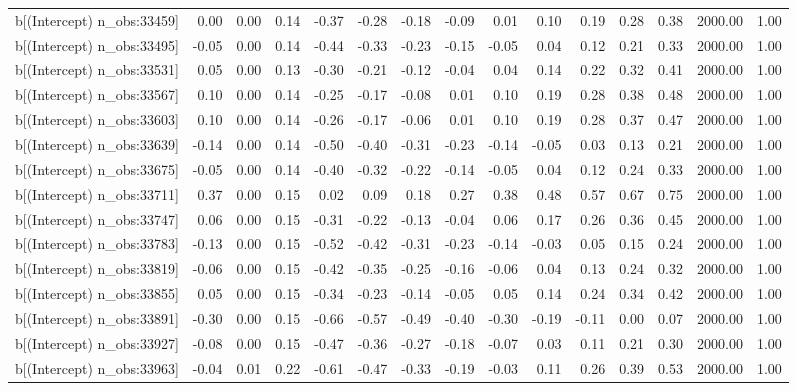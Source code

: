 \begin{table}[ht]
\begin{tabular}{rrrrrrrrrrrrrrr}
  b[(Intercept) n\_obs:33459] & 0.00 & 0.00 & 0.14 & -0.37 & -0.28 & -0.18 & -0.09 & 0.01 & 0.10 & 0.19 & 0.28 & 0.38 & 2000.00 & 1.00 \\ 
  b[(Intercept) n\_obs:33495] & -0.05 & 0.00 & 0.14 & -0.44 & -0.33 & -0.23 & -0.15 & -0.05 & 0.04 & 0.12 & 0.21 & 0.33 & 2000.00 & 1.00 \\ 
  b[(Intercept) n\_obs:33531] & 0.05 & 0.00 & 0.13 & -0.30 & -0.21 & -0.12 & -0.04 & 0.04 & 0.14 & 0.22 & 0.32 & 0.41 & 2000.00 & 1.00 \\ 
  b[(Intercept) n\_obs:33567] & 0.10 & 0.00 & 0.14 & -0.25 & -0.17 & -0.08 & 0.01 & 0.10 & 0.19 & 0.28 & 0.38 & 0.48 & 2000.00 & 1.00 \\ 
  b[(Intercept) n\_obs:33603] & 0.10 & 0.00 & 0.14 & -0.26 & -0.17 & -0.06 & 0.01 & 0.10 & 0.19 & 0.28 & 0.37 & 0.47 & 2000.00 & 1.00 \\ 
  b[(Intercept) n\_obs:33639] & -0.14 & 0.00 & 0.14 & -0.50 & -0.40 & -0.31 & -0.23 & -0.14 & -0.05 & 0.03 & 0.13 & 0.21 & 2000.00 & 1.00 \\ 
  b[(Intercept) n\_obs:33675] & -0.05 & 0.00 & 0.14 & -0.40 & -0.32 & -0.22 & -0.14 & -0.05 & 0.04 & 0.12 & 0.24 & 0.33 & 2000.00 & 1.00 \\ 
  b[(Intercept) n\_obs:33711] & 0.37 & 0.00 & 0.15 & 0.02 & 0.09 & 0.18 & 0.27 & 0.38 & 0.48 & 0.57 & 0.67 & 0.75 & 2000.00 & 1.00 \\ 
  b[(Intercept) n\_obs:33747] & 0.06 & 0.00 & 0.15 & -0.31 & -0.22 & -0.13 & -0.04 & 0.06 & 0.17 & 0.26 & 0.36 & 0.45 & 2000.00 & 1.00 \\ 
  b[(Intercept) n\_obs:33783] & -0.13 & 0.00 & 0.15 & -0.52 & -0.42 & -0.31 & -0.23 & -0.14 & -0.03 & 0.05 & 0.15 & 0.24 & 2000.00 & 1.00 \\ 
  b[(Intercept) n\_obs:33819] & -0.06 & 0.00 & 0.15 & -0.42 & -0.35 & -0.25 & -0.16 & -0.06 & 0.04 & 0.13 & 0.24 & 0.32 & 2000.00 & 1.00 \\ 
  b[(Intercept) n\_obs:33855] & 0.05 & 0.00 & 0.15 & -0.34 & -0.23 & -0.14 & -0.05 & 0.05 & 0.14 & 0.24 & 0.34 & 0.42 & 2000.00 & 1.00 \\ 
  b[(Intercept) n\_obs:33891] & -0.30 & 0.00 & 0.15 & -0.66 & -0.57 & -0.49 & -0.40 & -0.30 & -0.19 & -0.11 & 0.00 & 0.07 & 2000.00 & 1.00 \\ 
  b[(Intercept) n\_obs:33927] & -0.08 & 0.00 & 0.15 & -0.47 & -0.36 & -0.27 & -0.18 & -0.07 & 0.03 & 0.11 & 0.21 & 0.30 & 2000.00 & 1.00 \\ 
  b[(Intercept) n\_obs:33963] & -0.04 & 0.01 & 0.22 & -0.61 & -0.47 & -0.33 & -0.19 & -0.03 & 0.11 & 0.26 & 0.39 & 0.53 & 2000.00 & 1.00 \\ 

\end{tabular}
\end{table}
